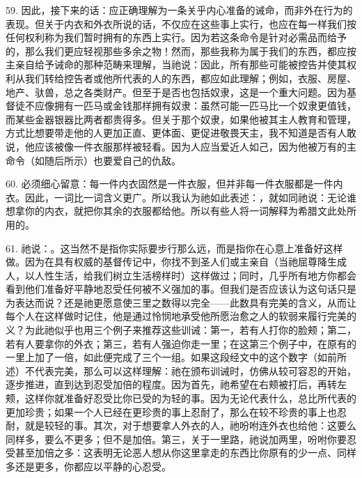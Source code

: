 59. 因此，接下来的话：应正确理解为一条关乎内心准备的诫命，而非外在行为的表现。但关于内衣和外衣所说的话，不仅应在这些事上实行，也应在每一样我们按任何权利称为我们暂时拥有的东西上实行。因为若这条命令是针对必需品而给予的，那么我们更应轻视那些多余之物！然而，那些我称为属于我们的东西，都应按主亲自给予诫命的那种范畴来理解，当祂说：因此，所有那些可能被控告并使其权利从我们转给控告者或他所代表的人的东西，都应如此理解；例如，衣服、房屋、地产、驮兽，总之各类财产。但至于是否也包括奴隶，这是一个重大问题。因为基督徒不应像拥有一匹马或金钱那样拥有奴隶：虽然可能一匹马比一个奴隶更值钱，而某些金器银器比两者都贵得多。但关于那个奴隶，如果他被其主人教育和管理，方式比想要带走他的人更加正直、更体面、更促进敬畏天主，我不知道是否有人敢说，他应该被像一件衣服那样被轻看。因为人应当爱近人如己，因为他被万有的主命令（如随后所示）也要爱自己的仇敌。\par

60. 必须细心留意：每一件内衣固然是一件衣服，但并非每一件衣服都是一件内衣。因此，一词比一词含义更广。所以我认为祂如此表述：，就如同祂说：无论谁想拿你的内衣，就把你其余的衣服都给他。所以有些人将一词解释为希腊文此处所用的。\par

61. 祂说：。这当然不是指你实际要步行那么远，而是指你在心意上准备好这样做。因为在具有权威的基督传记中，你找不到圣人们或主亲自（当祂屈尊降生成人，以人性生活，给我们树立生活榜样时）这样做过；同时，几乎所有地方你都会看到他们准备好平静地忍受任何被不义强加的事。但我们是否应该认为这句话只是为表达而说？还是祂更愿意使三里之数得以完全——此数具有完美的含义，从而让每个人在这样做时记住，他是通过怜悯地承受他所愿治愈之人的软弱来履行完美的义？为此祂似乎也用三个例子来推荐这些训诫：第一，若有人打你的脸颊；第二，若有人要拿你的外衣；第三，若有人强迫你走一里；在这第三个例子中，在原有的一里上加了一倍，如此便完成了三个一组。如果这段经文中的这个数字（如前所述）不代表完美，那么可以这样理解：祂在颁布训诫时，仿佛从较可容忍的开始，逐步推进，直到达到忍受加倍的程度。因为首先，祂希望在右颊被打后，再转左颊，这样你就准备好忍受比你已受的为轻的事。因为无论代表什么，总比所代表的更加珍贵；如果一个人已经在更珍贵的事上忍耐了，那么在较不珍贵的事上也忍耐，就是较轻的事。其次，对于想要拿人外衣的人，祂吩咐连外衣也给他：这要么同样多，要么不更多；但不是加倍。第三，关于一里路，祂说加两里，吩咐你要忍受甚至加倍之多：这表明无论恶人想从你这里拿走的东西比你原有的少一点、同样多还是更多，你都应以平静的心忍受。\par

